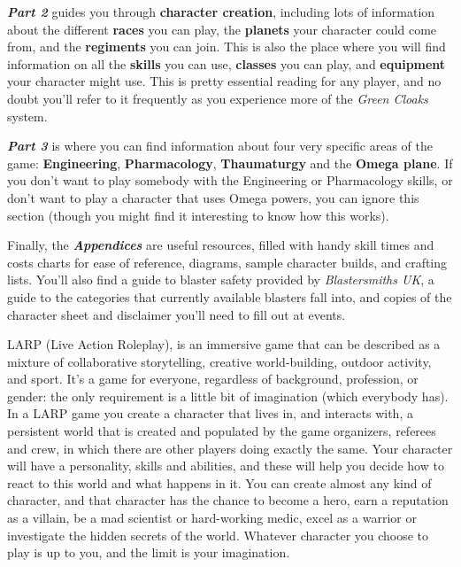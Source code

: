 \documentclass{scrbook}
\begin{document}
\textbf{\textit{Part 2}} guides you through \textbf{character creation}, including lots of information about the different \textbf{races} you can play, the \textbf{planets} your character could come from, and the \textbf{regiments} you can join. This is also the place where you will find information on all the \textbf{skills} you can use, \textbf{classes} you can play, and \textbf{equipment} your character might use. This is pretty essential reading for any player, and no doubt you'll refer to it frequently as you experience more of the \textit{Green Cloaks} system.

\textbf{\textit{Part 3}} is where you can find information about four very specific areas of the game: \textbf{Engineering}, \textbf{Pharmacology}, \textbf{Thaumaturgy} and the \textbf{Omega plane}. If you don't want to play somebody with the Engineering or Pharmacology skills, or don't want to play a character that uses Omega powers, you can ignore this section (though you might find it interesting to know how this works).

Finally, the \textbf{\textit{Appendices}} are useful resources, filled with handy skill times and costs charts for ease of reference, diagrams, sample character builds, and crafting lists. You'll also find a guide to blaster safety provided by \textit{Blastersmiths UK}, a guide to the categories that currently available blasters fall into, and copies of the character sheet and disclaimer you'll need to fill out at events.

LARP (Live Action Roleplay), is an immersive game that can be described as a mixture of collaborative storytelling, creative world-building, outdoor activity, and sport. It's a game for everyone, regardless of background, profession, or gender: the only requirement is a little bit of imagination (which everybody has). In a LARP game you create a character that lives in, and interacts with, a persistent world that is created and populated by the game organizers, referees and crew, in which there are other players doing exactly the same. Your character will have a personality, skills and abilities, and these will help you decide how to react to this world and what happens in it. You can create almost any kind of character, and that character has the chance to become a hero, earn a reputation as a villain, be a mad scientist or hard-working medic, excel as a warrior or investigate the hidden secrets of the world. Whatever character you choose to play is up to you, and the limit is your imagination.
\end{document}
